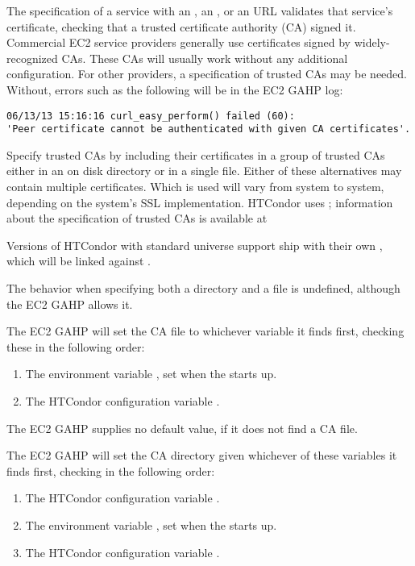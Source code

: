 The specification of a service with an , an ,
or an  URL validates that service's certificate,
checking that a trusted certificate authority (CA) signed it.
Commercial EC2 service providers generally use certificates signed by 
widely-recognized CAs.
These CAs will usually work without any additional configuration.  
For other providers, a specification of trusted CAs may be needed.
Without, errors such as the following will be in the EC2 GAHP log:

\footnotesize
\begin{verbatim}
06/13/13 15:16:16 curl_easy_perform() failed (60): 
'Peer certificate cannot be authenticated with given CA certificates'.
\end{verbatim}
\normalsize

Specify trusted CAs by including their certificates in a group of trusted CAs
either in an on disk directory or in a single file. 
Either of these alternatives may contain multiple certificates.  
Which is used will vary from system to system, 
depending on the system's SSL implementation. 
HTCondor uses ; 
information about the  specification of trusted CAs
is available at 


Versions of HTCondor with standard universe support ship with their 
own , which will be linked against .

The behavior when specifying both a directory and a file is undefined, 
although the EC2 GAHP allows it.

The EC2 GAHP will set the CA file to whichever variable it finds first, 
checking these in the following order:

\begin{enumerate}
\item The environment variable ,
  set when the  starts up.
\item The HTCondor configuration variable .
\end{enumerate}

The EC2 GAHP supplies no default value, if it does not find a CA file.

The EC2 GAHP will set the CA directory given whichever of these
variables it finds first, 
checking in the following order:

\begin{enumerate}
\item The HTCondor configuration variable .
\item The environment variable ,
  set when the  starts up.
\item The HTCondor configuration variable .
\end{enumerate}

